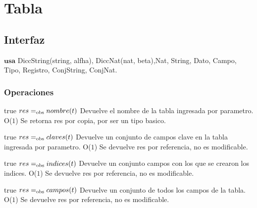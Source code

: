 



\section{Tabla}

\subsection{Interfaz}

$\textbf{usa}${ DiccString(string, alfha),} {DiccNat(nat, beta),}{Nat, String, Dato, Campo, Tipo, Registro, ConjString, ConjNat.}



\subsubsection*{Operaciones}



 {true}
 {$res =_{\mathrm{obs}} nombre(t)$}
 {Devuelve el nombre de la tabla ingresada por parametro.}
 {O($1$)}
 {Se retorna res por copia, por ser un tipo basico.}

 {true}
 {$res =_{\mathrm{obs}} claves(t)$}
 {Devuelve un conjunto de campos clave en la tabla ingresada por parametro.}
 {O($1$)}
 {Se devuelve res por referencia, no es modificable.}
 
 {true}
 {$res =_{\mathrm{obs}} indices(t)$}
 {Devuelve un conjunto campos con los que se crearon los indices.}
 {O($1$)}
 {Se devuelve res por referencia, no es modificable.}
 
 {true}
 {$res =_{\mathrm{obs}} campos(t)$}
 {Devuelve un conjunto de todos los campos de la tabla.}
 {O($1$)}
 {Se devuelve res por referencia, no es modificable.}

